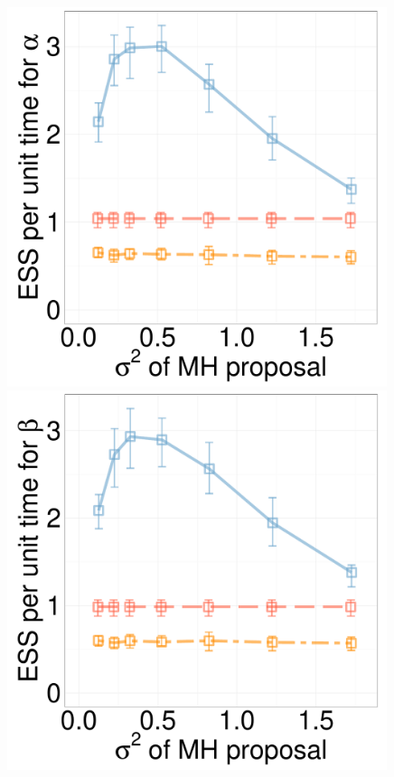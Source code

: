   \begin{figure}[H]
  \centering
  \begin{minipage}[!hp]{0.24\linewidth}
    \includegraphics [width=0.99\textwidth, angle=0]{figs/new_experiment_figs/cq_alpha_dim3_k2.pdf}
\end{minipage}
  \begin{minipage}[hp]{0.24\linewidth}
  \centering
    \includegraphics [width=0.99\textwidth, angle=0]{figs/new_experiment_figs/cq_beta_dim3_k2.pdf}

\end{minipage}
\end{figure}
